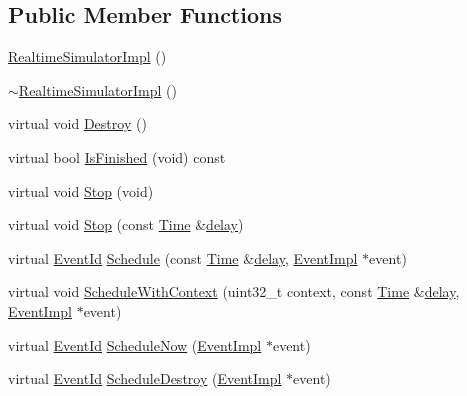 \subsection*{Public Member Functions}
\begin{DoxyCompactItemize}
\item 
\hyperlink{classns3_1_1RealtimeSimulatorImpl_a4727f4ce08c40210d4139d88db084e59}{Realtime\+Simulator\+Impl} ()
\item 
\hyperlink{classns3_1_1RealtimeSimulatorImpl_ac1f058a6adfae0151caec2e44d0403bb}{$\sim$\+Realtime\+Simulator\+Impl} ()
\item 
virtual void \hyperlink{classns3_1_1RealtimeSimulatorImpl_aec837c649daccb5e38e2761cb6499da2}{Destroy} ()
\item 
virtual bool \hyperlink{classns3_1_1RealtimeSimulatorImpl_a2296588467baae5aa2d8b785116d5847}{Is\+Finished} (void) const 
\item 
virtual void \hyperlink{classns3_1_1RealtimeSimulatorImpl_a0c50bef7e119cb24ebcbc9e11a701c73}{Stop} (void)
\item 
virtual void \hyperlink{classns3_1_1RealtimeSimulatorImpl_a771b84498d01a1be74a21a8058d9481c}{Stop} (const \hyperlink{classns3_1_1Time}{Time} \&\hyperlink{mmwave_2model_2fading-traces_2fading__trace__generator_8m_a7964e6aa8f61a9d28973c8267a606ad8}{delay})
\item 
virtual \hyperlink{classns3_1_1EventId}{Event\+Id} \hyperlink{classns3_1_1RealtimeSimulatorImpl_a2ff9f754084280c9f478cc7028cce3bf}{Schedule} (const \hyperlink{classns3_1_1Time}{Time} \&\hyperlink{mmwave_2model_2fading-traces_2fading__trace__generator_8m_a7964e6aa8f61a9d28973c8267a606ad8}{delay}, \hyperlink{classns3_1_1EventImpl}{Event\+Impl} $\ast$event)
\item 
virtual void \hyperlink{classns3_1_1RealtimeSimulatorImpl_a15a78217382eeb5cd45722e57b8f4946}{Schedule\+With\+Context} (uint32\+\_\+t context, const \hyperlink{classns3_1_1Time}{Time} \&\hyperlink{mmwave_2model_2fading-traces_2fading__trace__generator_8m_a7964e6aa8f61a9d28973c8267a606ad8}{delay}, \hyperlink{classns3_1_1EventImpl}{Event\+Impl} $\ast$event)
\item 
virtual \hyperlink{classns3_1_1EventId}{Event\+Id} \hyperlink{classns3_1_1RealtimeSimulatorImpl_a1a8a487e77cd4ecb43c4eaa31705656b}{Schedule\+Now} (\hyperlink{classns3_1_1EventImpl}{Event\+Impl} $\ast$event)
\item 
virtual \hyperlink{classns3_1_1EventId}{Event\+Id} \hyperlink{classns3_1_1RealtimeSimulatorImpl_ae22a54510f33ada8fa03f90ba7e38bda}{Schedule\+Destroy} (\hyperlink{classns3_1_1EventImpl}{Event\+Impl} $\ast$event)

\end{DoxyCompactItemize}
